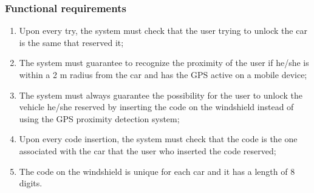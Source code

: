 \subsubsection{Functional requirements}
\begin{enumerate}
\item Upon every try, the system must check that the user trying to unlock the car is the same that reserved it;
\item The system must guarantee to recognize the proximity of the user if he/she is within a 2 m radius from the car and has the GPS active on a mobile device;
\item The system must always guarantee the possibility for the user to unlock the vehicle he/she reserved by inserting the code on the windshield instead of using the GPS proximity detection system;
\item Upon every code insertion, the system must check that the code is the one associated with the car that the user who inserted the code reserved;
\item The code on the windshield is unique for each car and it has a length of 8 digits.
\end{enumerate}

